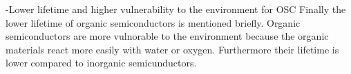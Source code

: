 -Lower lifetime and higher vulnerability to the environment for OSC
Finally the lower lifetime of organic semiconductors is mentioned briefly. Organic semiconductors are more vulnorable to the environment because the organic materials react more easily with water or oxygen. Furthermore their lifetime is lower compared to inorganic semicunductors. 
